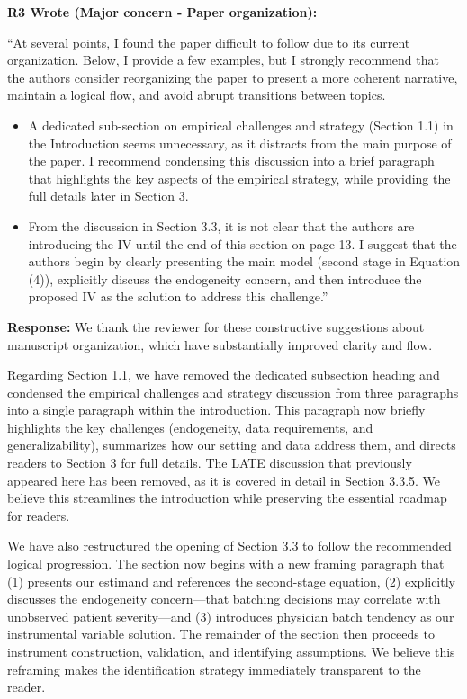 \documentclass[11pt]{article}
\newenvironment{quote2}
{ \bigskip
\noindent
         \small\em
         \baselineskip=14pt
}
\newcommand{\1}{\hbox{\rm 1\kern-.35em 1}}
\begin{document}
\color{black}



\begin{quote2}
\textbf{R3 Wrote (Major concern -  Paper organization):}  

\noindent``At several points, I found the paper difficult to follow due to its current organization. Below, I provide a few examples, but I strongly recommend that the authors consider reorganizing the paper to present a more coherent narrative, maintain a logical flow, and avoid abrupt transitions between topics.

\begin{itemize}
    \item A dedicated sub-section on empirical challenges and strategy (Section 1.1) in the Introduction seems unnecessary, as it distracts from the main purpose of the paper. I recommend condensing this discussion into a brief paragraph that highlights the key aspects of the empirical strategy, while providing the full details later in Section 3.
    \item From the discussion in Section 3.3, it is not clear that the authors are introducing the IV until the end of this section on page 13. I suggest that the authors begin by clearly presenting the main model (second stage in Equation (4)), explicitly discuss the endogeneity concern, and then introduce the proposed IV as the solution to address this challenge.''
\end{itemize}

\end{quote2}

\noindent\textbf{Response:} \color{blue}We thank the reviewer for these constructive suggestions about manuscript organization, which have substantially improved clarity and flow.

Regarding Section 1.1, we have removed the dedicated subsection heading and condensed the empirical challenges and strategy discussion from three paragraphs into a single paragraph within the introduction. This paragraph now briefly highlights the key challenges (endogeneity, data requirements, and generalizability), summarizes how our setting and data address them, and directs readers to Section 3 for full details. The LATE discussion that previously appeared here has been removed, as it is covered in detail in Section 3.3.5. We believe this streamlines the introduction while preserving the essential roadmap for readers.

We have also restructured the opening of Section 3.3 to follow the recommended logical progression. The section now begins with a new framing paragraph that (1) presents our estimand and references the second-stage equation, (2) explicitly discusses the endogeneity concern—that batching decisions may correlate with unobserved patient severity—and (3) introduces physician batch tendency as our instrumental variable solution. The remainder of the section then proceeds to instrument construction, validation, and identifying assumptions. We believe this reframing makes the identification strategy immediately transparent to the reader.
\end{document}
